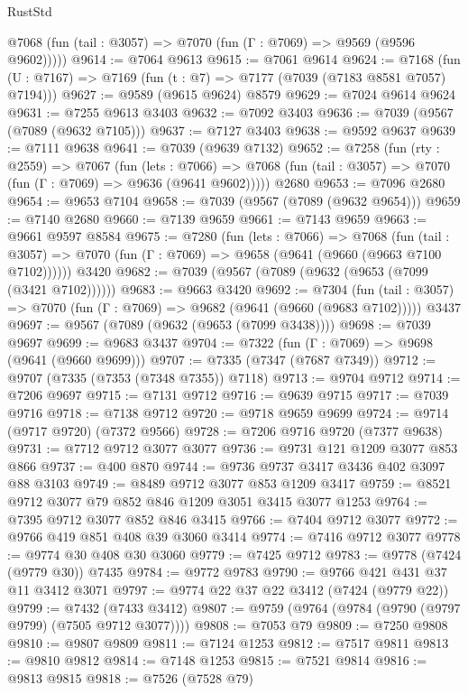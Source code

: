 \begin{lexlean}{RustStd}
\begin{coremodule}
      @7068 (fun (tail : @3057) => @7070 (fun (Γ : @7069) => @9569 (@9596 @9602)))))
@9614 := @7064 @9613
@9615 := @7061 @9614
@9624 := @7168 (fun (U : @7167) => @7169 (fun (t : @7) => @7177 (@7039 (@7183 @8581 @7057) @7194)))
@9627 := @9589 (@9615 @9624) @8579
@9629 := @7024 @9614 @9624
@9631 := @7255 @9613 @3403
@9632 := @7092 @3403
@9636 := @7039 (@9567 (@7089 (@9632 @7105)))
@9637 := @7127 @3403
@9638 := @9592 @9637
@9639 := @7111 @9638
@9641 := @7039 (@9639 @7132)
@9652 := @7258
    (fun (rty : @2559) =>
    @7067
      (fun (lets : @7066) =>
      @7068 (fun (tail : @3057) => @7070 (fun (Γ : @7069) => @9636 (@9641 @9602)))))
    @2680
@9653 := @7096 @2680
@9654 := @9653 @7104
@9658 := @7039 (@9567 (@7089 (@9632 @9654)))
@9659 := @7140 @2680
@9660 := @7139 @9659
@9661 := @7143 @9659
@9663 := @9661 @9597 @8584
@9675 := @7280
    (fun (lets : @7066) =>
    @7068
      (fun (tail : @3057) => @7070 (fun (Γ : @7069) => @9658 (@9641 (@9660 (@9663 @7100 @7102))))))
    @3420
@9682 := @7039 (@9567 (@7089 (@9632 (@9653 (@7099 (@3421 @7102))))))
@9683 := @9663 @3420
@9692 := @7304
    (fun (tail : @3057) => @7070 (fun (Γ : @7069) => @9682 (@9641 (@9660 (@9683 @7102)))))
    @3437
@9697 := @9567 (@7089 (@9632 (@9653 (@7099 @3438))))
@9698 := @7039 @9697
@9699 := @9683 @3437
@9704 := @7322 (fun (Γ : @7069) => @9698 (@9641 (@9660 @9699)))
@9707 := @7335 (@7347 (@7687 @7349))
@9712 := @9707 (@7335 (@7353 (@7348 @7355)) @7118)
@9713 := @9704 @9712
@9714 := @7206 @9697
@9715 := @7131 @9712
@9716 := @9639 @9715
@9717 := @7039 @9716
@9718 := @7138 @9712
@9720 := @9718 @9659 @9699
@9724 := @9714 (@9717 @9720) (@7372 @9566)
@9728 := @7206 @9716 @9720 (@7377 @9638)
@9731 := @7712 @9712 @3077 @3077
@9736 := @9731 @121 @1209 @3077 @853 @866
@9737 := @400 @870
@9744 := @9736 @9737 @3417 @3436 @402 @3097 @88 @3103
@9749 := @8489 @9712 @3077 @853 @1209 @3417
@9759 := @8521 @9712 @3077 @79 @852 @846 @1209 @3051 @3415 @3077 @1253
@9764 := @7395 @9712 @3077 @852 @846 @3415
@9766 := @7404 @9712 @3077
@9772 := @9766 @419 @851 @408 @39 @3060 @3414
@9774 := @7416 @9712 @3077
@9778 := @9774 @30 @408 @30 @3060
@9779 := @7425 @9712
@9783 := @9778 (@7424 (@9779 @30)) @7435
@9784 := @9772 @9783
@9790 := @9766 @421 @431 @37 @11 @3412 @3071
@9797 := @9774 @22 @37 @22 @3412 (@7424 (@9779 @22))
@9799 := @7432 (@7433 @3412)
@9807 := @9759 (@9764 (@9784 (@9790 (@9797 @9799) (@7505 @9712 @3077))))
@9808 := @7053 @79
@9809 := @7250 @9808
@9810 := @9807 @9809
@9811 := @7124 @1253
@9812 := @7517 @9811
@9813 := @9810 @9812
@9814 := @7148 @1253
@9815 := @7521 @9814
@9816 := @9813 @9815
@9818 := @7526 (@7528 @79)

\end{coremodule}
\end{lexlean}
